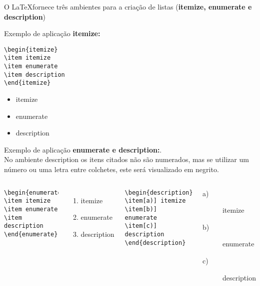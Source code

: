 \begin{frame}[fragile]
O \LaTeX fornece três ambientes para a criação de listas ({\bf itemize, enumerate e description})

Exemplo de aplicação {\bf itemize:}

\begin{verbatim}
\begin{itemize}
\item itemize
\item enumerate
\item description
\end{itemize}
\end{verbatim}
\begin{itemize}
\item itemize
\item enumerate
\item description
\end{itemize}
\end{frame}


\begin{frame}[fragile]
Exemplo de aplicação {\bf enumerate e description:}.\\
No ambiente description os itens citados não são numerados, 
mas se utilizar um número ou uma letra entre colchetes, este será visualizado em negrito.
\vspace*{-0.5cm}
\begin{columns}
\column[t]{5cm}
\begin{verbatim}
\begin{enumerate}
\item itemize
\item enumerate
\item description
\end{enumerate}
\end{verbatim}
\begin{enumerate}
\item itemize
\item enumerate
\item description
\end{enumerate}

\column[t]{6cm}
\begin{verbatim}
\begin{description}
\item[a)] itemize
\item[b)] enumerate
\item[c)] description
\end{description}
\end{verbatim}
\begin{description}
\item[a)] itemize
\item[b)] enumerate
\item[c)] description
\end{description}
\end{columns}
\end{frame}

